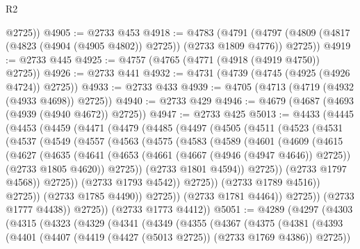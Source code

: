 \begin{lexlean}{R2}
\begin{coremodule}
        @2725))
@4905 := @2733 @453
@4918 := @4783
    (@4791 (@4797 (@4809 (@4817 (@4823 (@4904 (@4905 @4802)) @2725)) (@2733 @1809 @4776)) @2725))
@4919 := @2733 @445
@4925 := @4757 (@4765 (@4771 (@4918 (@4919 @4750)) @2725))
@4926 := @2733 @441
@4932 := @4731 (@4739 (@4745 (@4925 (@4926 @4724)) @2725))
@4933 := @2733 @433
@4939 := @4705 (@4713 (@4719 (@4932 (@4933 @4698)) @2725))
@4940 := @2733 @429
@4946 := @4679 (@4687 (@4693 (@4939 (@4940 @4672)) @2725))
@4947 := @2733 @425
@5013 := @4433
    (@4445
      (@4453
        (@4459
          (@4471
            (@4479
              (@4485
                (@4497
                  (@4505
                    (@4511
                      (@4523
                        (@4531
                          (@4537
                            (@4549
                              (@4557
                                (@4563
                                  (@4575
                                    (@4583
                                      (@4589
                                        (@4601
                                          (@4609
                                            (@4615
                                              (@4627
                                                (@4635
                                                  (@4641
                                                    (@4653
                                                      (@4661 (@4667 (@4946 (@4947 @4646)) @2725))
                                                      (@2733 @1805 @4620))
                                                    @2725))
                                                (@2733 @1801 @4594))
                                              @2725))
                                          (@2733 @1797 @4568))
                                        @2725))
                                    (@2733 @1793 @4542))
                                  @2725))
                              (@2733 @1789 @4516))
                            @2725))
                        (@2733 @1785 @4490))
                      @2725))
                  (@2733 @1781 @4464))
                @2725))
            (@2733 @1777 @4438))
          @2725))
      (@2733 @1773 @4412))
@5051 := @4289
    (@4297
      (@4303
        (@4315
          (@4323
            (@4329
              (@4341
                (@4349
                  (@4355
                    (@4367
                      (@4375
                        (@4381
                          (@4393
                            (@4401 (@4407 (@4419 (@4427 (@5013 @2725)) (@2733 @1769 @4386)) @2725))

\end{coremodule}
\end{lexlean}
